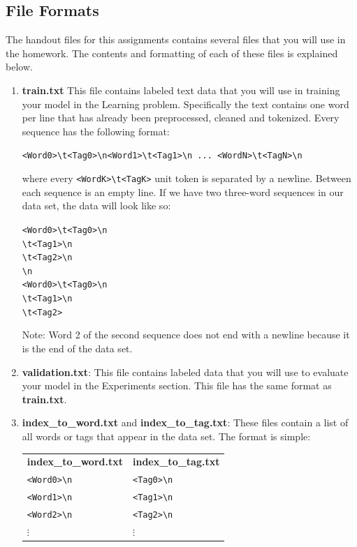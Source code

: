 \documentclass[11pt,addpoints,answers]{exam}
\begin{document}
\subsection{File Formats}\label{formats}
The handout files for this assignments contains several files that you will use in the homework. The contents and formatting of each of these files is explained below. 
\begin{enumerate}

\item \textbf{train.txt} This file contains labeled text data that you will use in training your model in the Learning problem. Specifically the text contains one word per line that has already been preprocessed, cleaned and tokenized. Every sequence has the following format:

    \texttt{<Word0>\textbackslash t<Tag0>\textbackslash n<Word1>\textbackslash t<Tag1>\textbackslash n ... <WordN>\textbackslash t<TagN>\textbackslash n}

where every \texttt{<WordK>\textbackslash t<TagK>} unit token is separated by a newline. Between each sequence is an empty line. If we have two three-word sequences in our data set, the data will look like so:

    \texttt{<Word0>\textbackslash t<Tag0>\textbackslash n\\<Word1>\textbackslash t<Tag1>\textbackslash n\\<Word2>\textbackslash t<Tag2>\textbackslash n\\\textbackslash n\\}
    \texttt{<Word0>\textbackslash t<Tag0>\textbackslash n\\<Word1>\textbackslash t<Tag1>\textbackslash n\\<Word2>\textbackslash t<Tag2>}
    
Note: Word 2 of the second sequence does not end with a newline because it is the end of the data set.

\item \textbf{validation.txt}: This file contains labeled data that you will use to evaluate your model in the Experiments section. This file has the same format as \textbf{train.txt}.
    
\item \textbf{index\_to\_word.txt} and \textbf{index\_to\_tag.txt}: These files contain a list of all words or tags that appear in the data set. The format is simple:

\begin{tabular}{ m{5cm}  m{5cm} } 
    \textbf{index\_to\_word.txt} & \textbf{index\_to\_tag.txt} \\
    \texttt{<Word0>\textbackslash n} & \texttt{<Tag0>\textbackslash n} \\
    \texttt{<Word1>\textbackslash n} & \texttt{<Tag1>\textbackslash n} \\
    \texttt{<Word2>\textbackslash n} & \texttt{<Tag2>\textbackslash n} \\
    $\vdots$ & $\vdots$
\end{tabular}


\end{enumerate}
\end{document}
